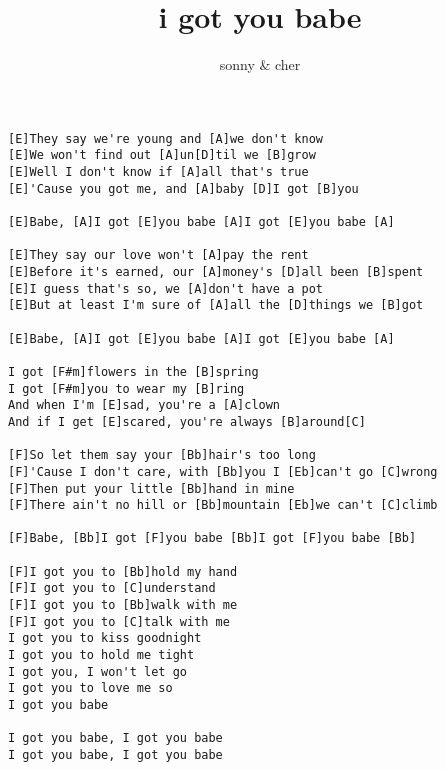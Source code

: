 \author{sonny \& cher}
\title{i got you babe}
\maketitle
\begin{verbatim}
[E]They say we're young and [A]we don't know 
[E]We won't find out [A]un[D]til we [B]grow 
[E]Well I don't know if [A]all that's true 
[E]'Cause you got me, and [A]baby [D]I got [B]you 

[E]Babe, [A]I got [E]you babe [A]I got [E]you babe [A]

[E]They say our love won't [A]pay the rent 
[E]Before it's earned, our [A]money's [D]all been [B]spent 
[E]I guess that's so, we [A]don't have a pot 
[E]But at least I'm sure of [A]all the [D]things we [B]got 

[E]Babe, [A]I got [E]you babe [A]I got [E]you babe [A]

I got [F#m]flowers in the [B]spring
I got [F#m]you to wear my [B]ring
And when I'm [E]sad, you're a [A]clown
And if I get [E]scared, you're always [B]around[C]

[F]So let them say your [Bb]hair's too long 
[F]'Cause I don't care, with [Bb]you I [Eb]can't go [C]wrong 
[F]Then put your little [Bb]hand in mine 
[F]There ain't no hill or [Bb]mountain [Eb]we can't [C]climb 

[F]Babe, [Bb]I got [F]you babe [Bb]I got [F]you babe [Bb]

[F]I got you to [Bb]hold my hand 
[F]I got you to [C]understand 
[F]I got you to [Bb]walk with me 
[F]I got you to [C]talk with me 
I got you to kiss goodnight 
I got you to hold me tight 
I got you, I won't let go 
I got you to love me so 
I got you babe

I got you babe, I got you babe
I got you babe, I got you babe
\end{verbatim}